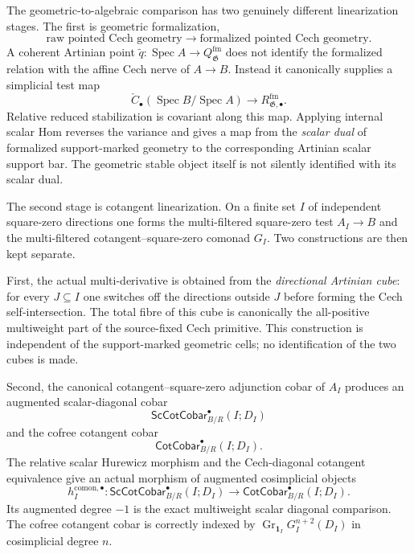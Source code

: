 The geometric-to-algebraic comparison has two genuinely different
linearization stages.  The first is geometric formalization,
\[
\boxed{
\text{raw pointed Cech geometry}
\longrightarrow
\text{formalized pointed Cech geometry}.}
\]
A coherent Artinian point
$\widetilde q:\operatorname{Spec}A\to Q_{\mathfrak G}^{\mathrm{fm}}$ does not
identify the formalized relation with the affine Cech nerve of $A\to B$.
Instead it canonically supplies a simplicial test map
\[
    \check C_\bullet
    (\operatorname{Spec}B/\operatorname{Spec}A)
    \longrightarrow
    R_{\mathfrak G,\bullet}^{\mathrm{fm}}.
\]
Relative reduced stabilization is covariant along this map.  Applying
internal scalar Hom reverses the variance and gives a map from the
\emph{scalar dual} of formalized support-marked geometry to the corresponding
Artinian scalar support bar.  The geometric stable object itself is not
silently identified with its scalar dual.

The second stage is cotangent linearization.  On a finite set $I$ of
independent square-zero directions one forms the multi-filtered square-zero
test $A_I\to B$ and the multi-filtered cotangent--square-zero comonad $G_I$.
Two constructions are then kept separate.

First, the actual multi-derivative is obtained from the \emph{directional
Artinian cube}: for every $J\subseteq I$ one switches off the directions outside
$J$ before forming the Cech self-intersection.  The total fibre of this cube is
canonically the all-positive multiweight part of the source-fixed Cech
primitive.  This construction is independent of the support-marked geometric
cells; no identification of the two cubes is made.

Second, the canonical cotangent--square-zero adjunction cobar of $A_I$
produces an augmented scalar-diagonal cobar
\[
    \mathsf{ScCotCobar}^{\bullet}_{B/R}(I;D_I)
\]
and the cofree cotangent cobar
\[
    \mathsf{CotCobar}^{\bullet}_{B/R}(I;D_I).
\]
The relative scalar Hurewicz morphism and the Cech-diagonal cotangent
equivalence give an actual morphism of augmented cosimplicial objects
\[
    h_I^{\mathrm{comon},\bullet}:
    \mathsf{ScCotCobar}^{\bullet}_{B/R}(I;D_I)
    \longrightarrow
    \mathsf{CotCobar}^{\bullet}_{B/R}(I;D_I).
\]
Its augmented degree $-1$ is the exact multiweight scalar diagonal comparison.
The cofree cotangent cobar is correctly indexed by
$\operatorname{Gr}_{\mathbf1_I}G_I^{n+2}(D_I)$ in cosimplicial degree $n$.

